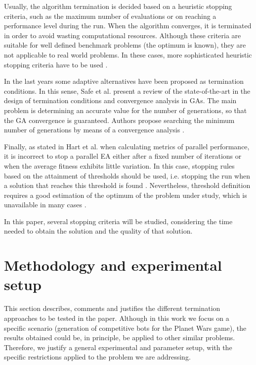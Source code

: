 \documentclass[runningheads,a4paper]{llncs}
\begin{document}
Usually, the algorithm termination is decided based on a heuristic stopping criteria, such as the maximum number of evaluations or on reaching a performance level during the run. 
When the algorithm converges, it is terminated in order to avoid wasting computational resources.
Although these criteria are suitable for well defined benchmark problems (the optimum is known), they are not applicable to real world problems. 
In these cases, more sophisticated heuristic stopping criteria have to be used \cite{NME2909,Wagner2009,Wagner2010}.

In the last years some adaptive alternatives have been proposed  as termination conditions.
In this sense, Safe et al. \cite{Safe2004} present a review of the state-of-the-art in the design of termination conditions and convergence analysis in GAs.
The main problem is determining an accurate value for the number of generations, so that the GA convergence is guaranteed.
Authors propose searching the minimum number of generations by means of a convergence analysis \cite{Rudolph1994}.


Finally, as stated in Hart et al. \cite{Hart1996} when calculating metrics of parallel performance, it is incorrect to stop a parallel EA either after a fixed number of iterations or when the average fitness exhibits little variation. In this case, stopping rules based on the attainment of thresholds should be used, i.e. stopping the run when a solution that reaches this threshold is found \cite{Sena2001}. Nevertheless, threshold definition requires a good estimation of the optimum of the problem under study, which is unavailable in many cases \cite{Safe2004}.

In this paper, several stopping criteria will be studied, considering the time needed to obtain the solution and the quality of that solution. 


%
%
\section{Methodology and experimental setup}
\label{sec:met}

This section describes, comments and justifies the different termination approaches to be tested in the paper. Although in this work we focus on a specific scenario (generation of competitive bots for the Planet Wars game), the results obtained could be, in principle, be applied to other similar problems. Therefore, we justify a general experimental and parameter setup, with the specific restrictions applied to the problem we are addressing. 
\end{document}
